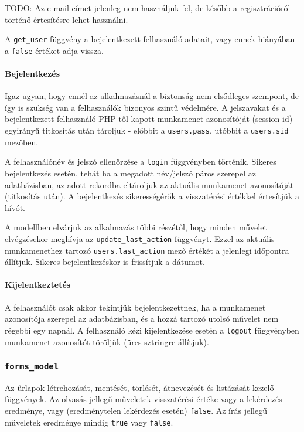 \documentclass[12pt,a4paper,twoside]{article}
\begin{document}
TODO:
Az e-mail címet jelenleg nem használjuk fel, de később a regisztrációról történő
értesítésre lehet használni.

A \texttt{get\_user} függvény a bejelentkezett felhasználó adatait, vagy ennek
hiányában a \texttt{false} értéket adja vissza.

\paragraph{Bejelentkezés}
Igaz ugyan, hogy ennél az alkalmazásnál a biztonság nem elsődleges szempont, de
így is szükség van a felhasználók bizonyos szintű védelmére. A jelszavakat és
a bejelentkezett felhasználó PHP-től kapott munkamenet-azonosítóját (session
id\cite{PHP-SID}) egyirányű titkosítás után tároljuk - előbbit a
\texttt{users.pass}, utóbbit a \texttt{users.sid} mezőben.

A felhasználónév és jelszó ellenőrzése a \texttt{login} függvényben
történik. Sikeres bejelentkezés esetén, tehát ha a megadott név/jelszó páros
szerepel az adatbázisban, az adott rekordba eltároljuk az aktuális munkamenet
azonosítóját (titkosítás után). A bejelentkezés sikerességérők a visszatérési
értékkel értesítjük a hívót.

A modellben elvárjuk az alkalmazás többi részétől, hogy minden művelet
elvégzésekor meghívja az \texttt{update\_last\_action} függvényt. Ezzel az
aktuális munkamenethez tartozó \texttt{users.last\_action} mező értékét a
jelenlegi időpontra állítjuk. Sikeres bejelentkezéskor is frissítjuk a dátumot.

\paragraph{Kijelentkeztetés}
A felhasználót csak akkor tekintjük bejelentkezettnek, ha a
munkamenet azonosítója szerepel az adatbázisban, és a hozzá tartozó utolsó
művelet nem régebbi egy napnál. A felhasználó kézi kijelentkezése esetén a
\texttt{logout} függvényben munkamenet-azonosítót töröljük (üres sztringre állítjuk).


\subsubsection{\texttt{forms\_model}}

Az űrlapok létrehozását, mentését, törlését, átnevezését és listázását kezelő
függvények. Az olvasás jellegű műveletek visszatérési értéke vagy a lekérdezés
eredménye, vagy (eredménytelen lekérdezés esetén) \texttt{false}. Az írás
jellegű műveletek eredménye mindig \texttt{true} vagy \texttt{false}.
\end{document}

